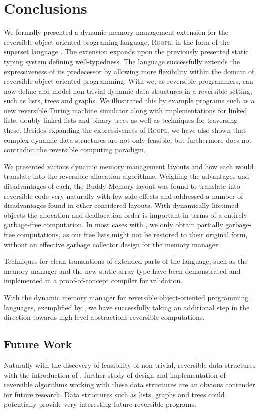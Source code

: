 \chapter{Conclusions}
\label{chp:conclusions}
We formally presented a dynamic memory management extension for the reversible object-oriented programing language, \textsc{Roopl}, in the form of the superset language \rooplpp. The extension expands upon the previously presented static typing system defining well-typedness. The language successfully extends the expressiveness of its predecessor by allowing more flexibility within the domain of reversible object-oriented programming. With \rooplpp we, as reversible programmers, can now define and model non-trivial dynamic data structures in a reversible setting, such as lists, trees and graphs. We illustrated this by example programs such as a new reversible Turing machine simulator along with implementations for linked lists, doubly-linked lists and binary trees as well as techniques for traversing these. Besides expanding the expressiveness of \textsc{Roopl}, we have also shown that complex dynamic data structures are not only feasible, but furthermore does not contradict the reversible computing paradigm.

We presented various dynamic memory management layouts and how each would translate into the reversible allocation algorithms. Weighing the advantages and disadvantages of each, the Buddy Memory layout was found to translate into reversible code very naturally with few side effects and addressed a number of disadvantages found in other considered layouts. With dynamically lifetimed objects the allocation and deallocation order is important in terms of a entirely garbage-free computation. In most cases with \rooplpp, we only obtain partially garbage-free computations, as our free lists might not be restored to their original form, without an effective garbage collector design for the memory manager.

Techniques for clean translations of extended parts of the language, such as the memory manager and the new static array type have been demonstrated and implemented in a proof-of-concept compiler for validation.

With the dynamic memory manager for reversible object-oriented programming languages, exemplified by \rooplpp, we have successfully taking an additional step in the direction towards high-level abstractions reversible computations.  

\section{Future Work}
\label{sec:future-work}
Naturally with the discovery of feasibility of non-trivial, reversible data structures with the introduction of \rooplpp, further study of design and implementation of reversible algorithms working with these data structures are an obvious contender for future research. Data structures such as lists, graphs and trees could potentially provide very interesting future reversible programs.


